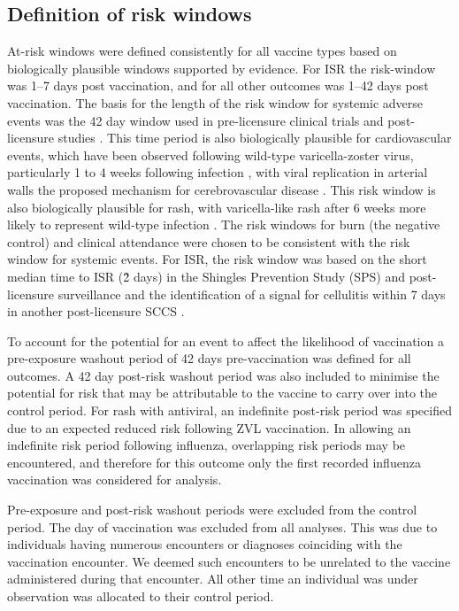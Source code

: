 \documentclass[review, endfloat]{elsarticle}
\begin{document}
\subsection{Definition of risk windows}
\label{sec:risk_windows}

At-risk windows were defined consistently for all vaccine types based on biologically plausible windows supported by evidence. For ISR the risk-window was 1–7 days post vaccination, and for all other outcomes was 1–42 days post vaccination. The basis for the length of the risk window for systemic adverse events was the 42 day window used in pre-licensure clinical trials \citep{oxman2005, schmader2012, murray2011, simberkoff2010} and post-licensure studies \citep{tseng2012,baxter2012}. This time period is also biologically plausible for cardiovascular events, which have been observed following wild-type varicella-zoster virus, particularly 1 to 4 weeks following infection \citep{minassian2015,schink2016}, with viral replication in arterial walls the proposed mechanism for cerebrovascular disease \citep{gilden2009}. This risk window is also biologically plausible for rash, with varicella-like rash after 6 weeks more likely to represent wild-type infection \citep{willis2017herpes}. The risk windows for burn (the negative control) and clinical attendance were chosen to be consistent with the risk window for systemic events. For ISR, the risk window was based on the short median time to ISR (\~2 days) in the Shingles Prevention Study (SPS) and post-licensure surveillance \citep{willis2017herpes,simberkoff2010} and the identification of a signal for cellulitis within 7 days in another post-licensure SCCS \citep{tseng2012}.

To account for the potential for an event to affect the likelihood of vaccination a pre-exposure washout period of 42 days pre-vaccination was defined for all outcomes. A 42 day post-risk washout period was also included to minimise the potential for risk that may be attributable to the vaccine to carry over into the control period.  For rash with antiviral, an indefinite post-risk period was specified due to an expected reduced risk following ZVL vaccination. In allowing an indefinite risk period following influenza, overlapping risk periods may be encountered, and therefore for this outcome only the first recorded influenza vaccination was considered for analysis.

Pre-exposure and post-risk washout periods were excluded from the control period. The day of vaccination was excluded from all analyses. This was due to individuals having numerous encounters or diagnoses coinciding with the vaccination encounter. We deemed such encounters to be unrelated to the vaccine administered during that encounter. All other time an individual was under observation was allocated to their control period.
\end{document}
